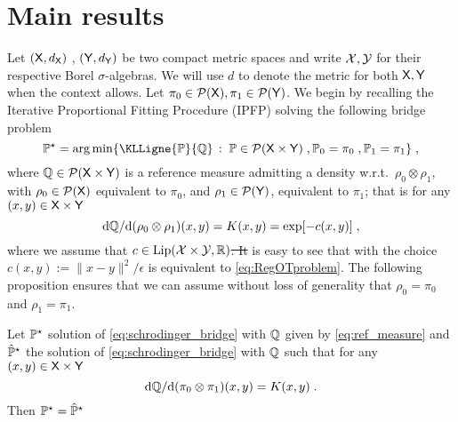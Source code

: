 \documentclass[11pt,a4paper]{article}
\providecommand{\DIFaddtex}[1]{{\protect\color{blue}\uwave{#1}}} %
\providecommand{\DIFdeltex}[1]{{\protect\color{red}\sout{#1}}}                      %
\providecommand{\DIFaddbegin}{} %
\providecommand{\DIFaddend}{} %
\providecommand{\DIFdelbegin}{} %
\providecommand{\DIFdelend}{} %
\providecommand{\DIFadd}[1]{\texorpdfstring{\DIFaddtex{#1}}{#1}} %
\providecommand{\DIFdel}[1]{\texorpdfstring{\DIFdeltex{#1}}{}} %
\begin{document}
\section{Main results}
\label{sec:main-results}
Let $(\mathsf{X}, d_{\mathsf{X}})$ , $(\mathsf{Y}, d_{\mathsf{Y}})$ be two compact metric spaces and write $\mathcal{X}, \mathcal{Y}$ for their respective Borel $\sigma$-algebras. We will use $d$ to denote the metric for both $\mathsf{X}, \mathsf{Y}$ when the context allows. 
Let
\DIFaddbegin \DIFadd{$\diam_\msx = \sup \ensembleLigne{\ddx(x_0, x_1)}{x_0, x_1 \in \msx}$,
$\diam_\msy = \sup \ensembleLigne{\ddy(y_0, y_1)}{y_0, y_1 \in \msy}$ and let
}\DIFaddend $\pi_0 \in \mathcal{P}(\mathsf{X}), \pi_1 \in \mathcal{P}(\mathsf{Y})$.  We begin by recalling the
Iterative Proportional Fitting Procedure (IPFP) solving the following \schro
bridge problem
\begin{equation}
  \label{eq:schrodinger_bridge}
\Pbb^\star = \argmin \ensembleLigne{\KLLigne{\Pbb}{\Qbb}}{\Pbb \in \Pens(\msx \times \msy) \eqsp , \Pbb_0 = \pi_0 \eqsp , \Pbb_1 = \pi_1} \eqsp ,
\end{equation}
where $\mathbb{Q} \in \mathcal{P}(\mathsf{X} \times \mathsf{Y})$ is a reference measure
admitting a density w.r.t.\ $\rho_0 \otimes \rho_1$, with $\rho_0 \in \mathcal{P}(\mathsf{X})$ equivalent to $\pi_0$, and $\rho_1\in\mathcal{P}(\mathsf{Y})$, equivalent to $\pi_1$; that is for any
$(x,y) \in \mathsf{X} \times \mathsf{Y}$
\begin{equation}
  \label{eq:ref_measure}
  \mathrm{d} \mathbb{Q} / \mathrm{d} (\rho_0 \otimes \rho_1)(x,y) = K(x,y) = \exp[-c(x,y)] \; ,
\end{equation}
where we assume that $c \in \operatorname{Lip}(\mathcal{X}\times\mathcal{Y}, \mathbb{R})$\DIFdelbegin \DIFdel{. It }\DIFdelend \DIFaddbegin \DIFadd{;
it }\DIFaddend is easy to see that  with the choice $c(x,y):= \|x-y\|^2/\epsilon$ is equivalent to \ref{eq:RegOTproblem}. The following proposition ensures
that we can assume without loss of generality that $\rho_0 = \pi_0$ and
$\rho_1 = \pi_1$.
\begin{proposition}
  Let $\mathbb{P}^\star$ solution of \eqref{eq:schrodinger_bridge}
  with $\mathbb{Q}$ given by \eqref{eq:ref_measure} and $\hat{\mathbb{P}}^\star$ the solution of \eqref{eq:schrodinger_bridge}
  with $\mathbb{Q}$ such that for any
$(x,y) \in \mathsf{X} \times \mathsf{Y}$
\begin{equation}
  \label{eq:ref_measure_duo}
  \rmd \Qbb / \rmd (\pi_0 \otimes \pi_1)(x,y) = K(x,y) \DIFaddbegin \eqsp \DIFaddend .
\end{equation}
Then $\mathbb{P}^\star = \hat{\mathbb{P}}^\star$
\end{proposition}
\end{document}
